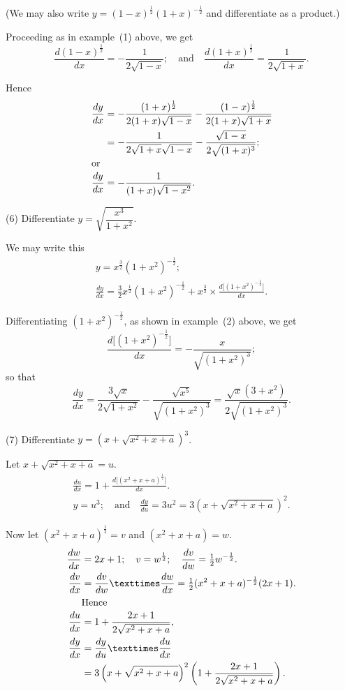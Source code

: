 \documentclass[12pt]{book}[2005/09/16]
\newcommand{\DPPageSep}[2]{\Pagelabel{#2}}
\newcommand{\Pagelabel}[1]
  {\phantomsection\label{#1}}
\newcommand{\DPtypo}[2]{#2}%
\newcommand{\efrac}[2]{\frac{#1}{#2}}
\begin{document}
(We may also write $y = (1-x)^{\efrac{1}{2}} (1+x)^{-\efrac{1}{2}}$ and differentiate
as a product.)
\DPPageSep{082.png}{70}%

Proceeding as in \DPtypo{exercise}{example}~(1) above, we get
\[
\frac{d(1-x)^{\efrac{1}{2}}}{dx} = -\frac{1}{2\sqrt{1-x}};
\quad\text{and}\quad
\frac{d(1+x)^{\efrac{1}{2}}}{dx} = \frac{1}{2\sqrt{1+x}}.
\]

Hence
\begin{align*}
\frac{dy}{dx}
  &= - \frac{(1 + x)^{\efrac{1}{2}}}{2(1 + x)\sqrt{1-x}}
     - \frac{(1 - x)^{\efrac{1}{2}}}{2(1 + x)\sqrt{1+x}} \\
  &= - \frac{1}{2\sqrt{1+x}\sqrt{1-x}} - \frac{\sqrt{1-x}}{2 \sqrt{(1+x)^3}};\\
\intertext{or}
\frac{dy}{dx}
  &= - \frac{1}{(1+x)\sqrt{1-x^2}}.
\end{align*}

(6) Differentiate $y = \sqrt{\dfrac{x^3}{1+x^2}}$.

We may write this
\begin{gather*}
y = x^{\efrac{3}{2}}(1+x^2)^{-\efrac{1}{2}}; \\
\frac{dy}{dx}
  = \tfrac{3}{2} x^{\efrac{1}{2}}(1 + x^2)^{-\efrac{1}{2}}
  + x^{\efrac{3}{2}} × \frac{d\bigl[(1+x^2)^{-\efrac{1}{2}}\bigr]}{dx}.
\end{gather*}

Differentiating $(1+x^2)^{-\efrac{1}{2}}$, as shown in \DPtypo{exercise}{example}~(2)
above, we get
\[
\frac{d\bigl[(1+x^2)^{-\efrac{1}{2}}\bigr]}{dx} = - \frac{x}{\sqrt{(1+x^2)^3}};
\]
so that
\[
\frac{dy}{dx}
  = \frac{3\sqrt{x}}{2\sqrt{1+x^2}} - \frac{\sqrt{x^5}}{\sqrt{(1+x^2)^3}}
  = \frac{\sqrt{x}(3+x^2)}{2\sqrt{(1+x^2)^3}}.
\]
\DPPageSep{083.png}{71}%

(7) Differentiate $y=(x+\sqrt{x^2+x+a})^3$.

Let $x+\sqrt{x^2+x+a}=u$.
\begin{gather*}
\frac{du}{dx} = 1 + \frac{d\bigl[(x^2+x+a)^{\efrac{1}{2}}\bigr]}{dx}. \\
y = u^3;\quad\text{and}\quad \frac{dy}{du} = 3u^2= 3\left(x+\sqrt{x^2+x+a}\right)^2.
\end{gather*}

Now let $(x^2+x+a)^{\efrac{1}{2}}=v$ and $(x^2+x+a) = w$.
\begin{align*}
\frac{dw}{dx}
  &= 2x+1;\quad v = w^{\efrac{1}{2}};\quad \frac{dv}{dw} = \tfrac{1}{2}w^{-\efrac{1}{2}}. \\
\frac{dv}{dx}
  &= \frac{dv}{dw} × \frac{dw}{dx} = \tfrac{1}{2}(x^2+x+a)^{-\efrac{1}{2}}(2x+1). \\
\intertext{\indent Hence}
\frac{du}{dx}
  &= 1 + \frac{2x+1}{2\sqrt{x^2+x+a}}, \\
\frac{dy}{dx}
  &= \frac{dy}{du} × \frac{du}{dx}\\
  &= 3\left(x+\sqrt{x^2+x+a}\right)^2
      \left(1 +\frac{2x+1}{2\sqrt{x^2+x+a}}\right).
\end{align*}
\end{document}
